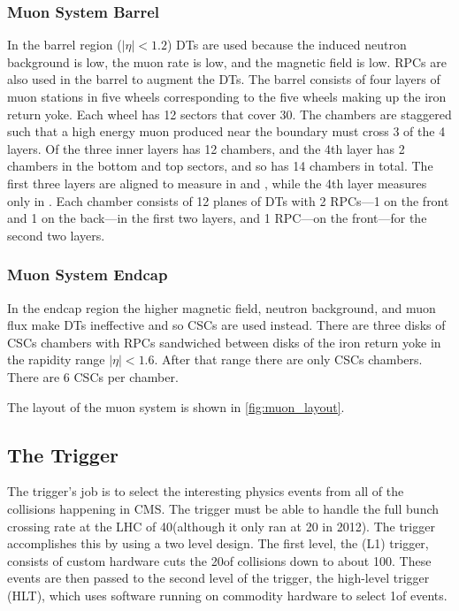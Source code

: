 \subsubsection{Muon System Barrel}

In the barrel region ($|\eta| < 1.2$) DTs are used because the induced neutron
background is low, the muon rate is low, and the magnetic field is low. RPCs
are also used in the barrel to augment the DTs. The barrel consists of four
layers of muon stations in five wheels corresponding to the five wheels making
up the iron return yoke. Each wheel has 12 sectors that cover 30\degrees. The
chambers are staggered such that a high energy muon produced near the boundary
must cross 3 of the 4 layers. Of the three inner layers has 12 chambers, and
the 4th layer has 2 chambers in the bottom and top sectors, and so has 14
chambers in total. The first three layers are aligned to measure in \coordrphi
and \coordz, while the 4th layer measures only in \coordrphi. Each chamber
consists of 12 planes of DTs with 2 RPCs---1 on the front and 1 on the
back---in the first two layers, and 1 RPC---on the front---for the second two
layers.

\subsubsection{Muon System Endcap}

In the endcap region the higher magnetic field, neutron background, and muon
flux make DTs ineffective and so CSCs are used instead. There are three disks
of CSCs chambers with RPCs sandwiched between disks of the iron return yoke in
the rapidity range $|\eta| < 1.6$. After that range there are only CSCs
chambers. There are 6 CSCs per chamber.

The layout of the muon system is shown in \cref{fig:muon_layout}.

\subsection{The Trigger}
\label{ssec:trigger}

The trigger's job is to select the interesting physics events from all of the
collisions happening in CMS. The trigger must be able to handle the full bunch
crossing rate at the LHC of 40\megahertz (although it only ran at 20\megahertz
in 2012). The trigger accomplishes this by using a two level design. The first
level, the \Lone (L1) trigger, consists of custom hardware cuts the
20\megahertz of collisions down to about 100\kilohertz. These events are then
passed to the second level of the trigger, the high-level trigger (HLT), which
uses software running on commodity hardware to select 1\kilohertz of events.

